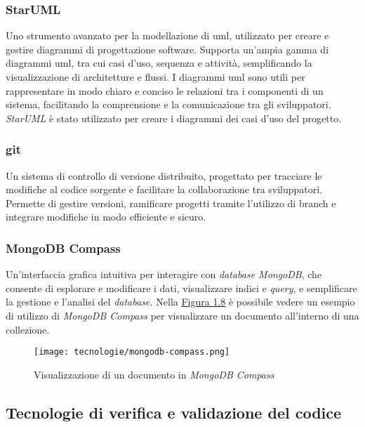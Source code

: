 \subsubsection{StarUML}

Uno strumento avanzato per la modellazione di \gls{uml}, utilizzato per creare e gestire diagrammi di progettazione software. Supporta un'ampia gamma di diagrammi \gls{uml}, tra cui casi d'uso, sequenza e attività, semplificando la visualizzazione di architetture e flussi.
I diagrammi \gls{uml} sono utili per rappresentare in modo chiaro e conciso le relazioni tra i componenti di un sistema, facilitando la comprensione e la comunicazione tra gli sviluppatori.\\
\textit{StarUML} è stato utilizzato per creare i diagrammi dei casi d’uso del progetto.

\pagebreak
\subsubsection{git}

Un sistema di controllo di versione distribuito, progettato per tracciare le modifiche al codice sorgente e facilitare la collaborazione tra sviluppatori. \\
Permette di gestire versioni, ramificare progetti tramite l'utilizzo di \gls{branch} e integrare modifiche in modo efficiente e sicuro. 

\subsubsection{MongoDB Compass}

Un'interfaccia grafica intuitiva per interagire con \textit{database MongoDB}, che consente di esplorare e modificare i dati, visualizzare indici e \textit{query},
e semplificare la gestione e l'analisi del \textit{database.}
Nella {\hyperref[fig:mongodb-compass]{Figura 1.8}} è possibile vedere un esempio di utilizzo di \textit{MongoDB Compass} per visualizzare un documento all'interno di una collezione.

\begin{figure}[H]
    \label{fig:mongodb-compass}
    \centering
    \texttt{[image: tecnologie/mongodb-compass.png]}
    \caption{Visualizzazione di un documento in \textit{MongoDB Compass}}
\end{figure}

\subsection{Tecnologie di verifica e validazione del codice}
\label{sez:tecnologie-validazione-codice}

